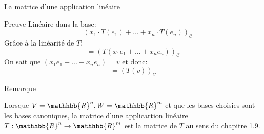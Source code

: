 \begin{parag}{La matrice d'une application linéaire}
\begin{subparag}{Preuve}
        Linéaire dans la base:
        \[= \left(x_1\cdot T\left(e_1\right) + \dots + x_n \cdot T\left(e_n\right)\right)_{\mathcal{C}}\]
        Grâce à la linéarité de $T$:
        \[= \left(T\left(x_1 e_1 + \dots + x_n e_n \right) \right)_{\mathcal{C}}\]
        On sait que $\left(x_1 e_1 + \dots + x_n e_n \right)  = v$ et donc:
\[ = \left(T\left(v\right)\right)_{\mathcal{C}}\]
    \end{subparag}
    \begin{subparag}{Remarque}
    \begin{framedremark}
        Lorsque $V = \mathhbb{R}^n, W = \mathhbb{R}^m$ et que les bases choisies sont les bases canoniques, la matrice d'une applicartion linéaire $T : \mathhbb{R}^n \to \mathhbb{R}^m$ est la matrice de $T$ au sens du chapitre 1.9.
    \end{framedremark}
        
    \end{subparag}


\end{parag}
